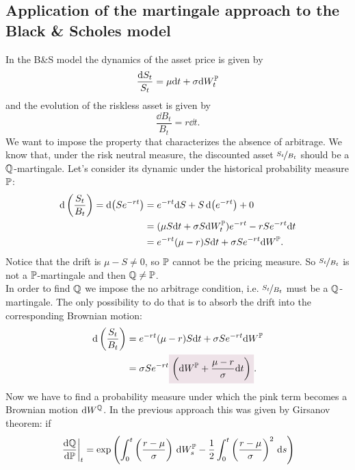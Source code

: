 \subsection[Application to the Black \& Scholes model]{Application of the martingale approach to the Black \& Scholes model}
In the B\&S model the dynamics of the asset price is given by
\begin{equation}\label{s}
    \dfrac{\dd S_t}{S_t} = \mu \dd t + \sigma \dd W_t^{\mathbb{P}}
\end{equation}
and the evolution of the riskless asset is given by
\begin{equation}
    \dfrac{\dd B_t}{B_t} = r \dd t.
\end{equation}
We want to impose the property that characterizes the absence of arbitrage. We know that, under the risk neutral measure, the discounted asset $\nicefrac{S_t}{B_t}$ should be a $\mathbb{Q}$-martingale. Let's consider its dynamic under the historical probability measure $\mathbb{P}$:
\begin{align}
    \dd\left(\frac{S_t}{B_t}\right) = \dd (Se^{-rt}) &= e^{-rt}\dd S + S\dd(e^{-rt}) + 0 \\
    &=
    (\mu S \dd t + \sigma S \dd W_t^{\mathbb{P}})e^{-rt} - rSe^{-rt} \dd t \\
    &=
    e^{-rt}(\mu - r)S\dd t + \sigma Se^{-rt} \dd W^{\mathbb{P}}.
\end{align}
Notice that the drift is $\mu-S\ne0$, so $\mathbb{P}$ cannot be the pricing measure. So $\nicefrac{S_t}{B_t}$ is not a $\mathbb{P}$-martingale and then $\mathbb{Q}\ne\mathbb{P}$. \\
In order to find $\mathbb{Q}$ we impose the no arbitrage condition, i.e. $\nicefrac{S_t}{B_t}$ must be a $\mathbb{Q}$-martingale. The only possibility to do that is to absorb the drift into the corresponding Brownian motion:
\begin{align}\label{drift}
    \notag \dd\left(\frac{S_t}{B_t}\right) &= e^{-rt}(\mu - r)S\dd t + \sigma Se^{-rt} \dd W^{\Pmeas}\\
    &=
    \sigma S e^{-rt}\hlc{mypink}{\left(\dd W^{\Pmeas} + \frac{\mu-r}{\sigma}\dd t\right)}.
\end{align}
Now we have to find a probability measure under which the pink term becomes a Brownian motion $\dd W^{\mathbb{Q}}$. In the previous approach this was given by Girsanov theorem: if
\begin{equation}\label{gis}
    \eval{\dv{\mathbb{Q}}{\mathbb{P}}}_t = \exp\left(\int^t_0 \left(\frac{r-\mu}{\sigma}\right)\,\dd W_s^{\mathbb{P}}-\dfrac{1}{2}\int^t_0 \left(\frac{r-\mu}{\sigma}\right)^2 \,\dd s\right)
\end{equation}
